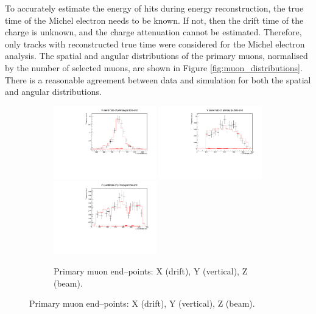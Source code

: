 To accurately estimate the energy of hits during energy reconstruction, the
true time of the Michel electron needs to be known. If not, then the drift 
time of the charge is unknown, and the charge attenuation cannot be estimated.
Therefore, only tracks with reconstructed true time were considered for the 
Michel electron analysis. The spatial and angular distributions of the primary 
muons, normalised by the number of selected muons, are shown in Figure 
\ref{fig:muon_distributions}. There is a reasonable agreement between data and 
simulation for both the spatial and angular distributions.
\begin{figure}

	\centering

	\begin{subfigure}[b]{\textwidth}
		\centering
		\includegraphics[width=0.49\textwidth]{figures/DataVMC_primary_EndX.pdf}
		\hfill
		\includegraphics[width=0.49\textwidth]{figures/DataVMC_primary_EndY.pdf}
		\includegraphics[width=0.49\textwidth]{figures/DataVMC_primary_EndZ.pdf}
		\caption {Primary muon end--points: X (drift), Y (vertical), Z (beam).}
		\label{fig:muon_endpoints}
	\end{subfigure}


\end{figure}
